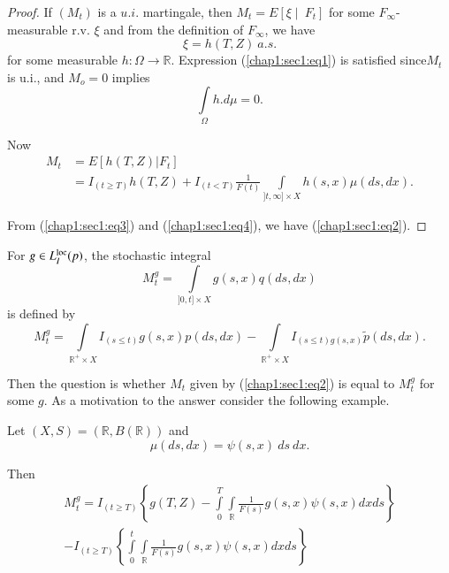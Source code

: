 \begin{proof}
  If $ (M_t)$ is a $u.i$. martingale, then $ M_t = E [ \xi \mid ~ F_t
  ] $ for some $ F_\infty $-measurable  r.v. $\xi $ and from the
  definition of $ F_\infty $, we have 
  $$
  \xi = h ( T, Z )~ a.s.
  $$
  for some measurable  $ h : \Omega \rightarrow  \mathbb{R}
  $. Expression (\ref{chap1:sec1:eq1}) is satisfied
  since\pageoriginale $M_t$ is u.i.,   and $M_o = 0$ implies   
  \begin{equation*}
    \int \limits_\Omega h. d \mu = 0. \tag{3}\label{chap1:sec1:eq3}
  \end{equation*}

Now
\begin{align*}
  M_t & = E[h(T, Z)|F_t] \\
  & = I_{(t \geq T)} h(T, Z) + I_{(t < T)} \frac{1}{F(t)}
  \int\limits_{] t, \infty ] \times X} h(s,x) \mu (ds,
      dx). \tag{4}\label{chap1:sec1:eq4}   
\end{align*}

From (\ref{chap1:sec1:eq3}) and (\ref{chap1:sec1:eq4}), we have
(\ref{chap1:sec1:eq2}). 
\end{proof}

For $g \in  L^{\operatorname{loc}}_I (p)$, the stochastic integral 
$$
M^g_t = \int \limits_{] 0,t ] \times X} {g(s,x) q(ds,dx)}
$$
is defined by
$$
M^g_t = \int \limits_{\mathbb{R}^+ \times X} I_{(s \leq t)}
    g(s,x) p(ds,dx)- \int \limits_{\mathbb{R}^+ \times X} I_{(s \leq
      t) g(s,x)} \tilde{p}(ds, dx). 
$$

Then the question is whether $M_t$ given by (\ref{chap1:sec1:eq2}) is
equal to $M^g_t$ for some $g$. As a motivation to the answer consider
the following example.	 

\begin{example}\label{chap1:exam1.1}%
  Let $(X, S) = (\mathbb{R}, B(\mathbb{R}))$ and 
  $$
  \mu (ds, dx) = \psi(s,x) ~ds ~dx.
  $$
\end{example}

Then 
\begin{multline*}
  M^g_t  = I_{(t \ge T)} \left\{ g(T,Z) - \int \limits^T_0 \int
  \limits_{\mathbb{R}} \frac{1}{F(s)} g(s,x) \psi (s,x)dx ds \right\} \\ 
  -  I_{(t \ge T)} \left\{ \int \limits^t_0 \int\limits_{\mathbb{R}}
  \frac{1}{F(s)} g(s,x) \psi (s,x)dx ds \right\} \tag{5}\label{chap1:sec1:eq5} 
\end{multline*}

